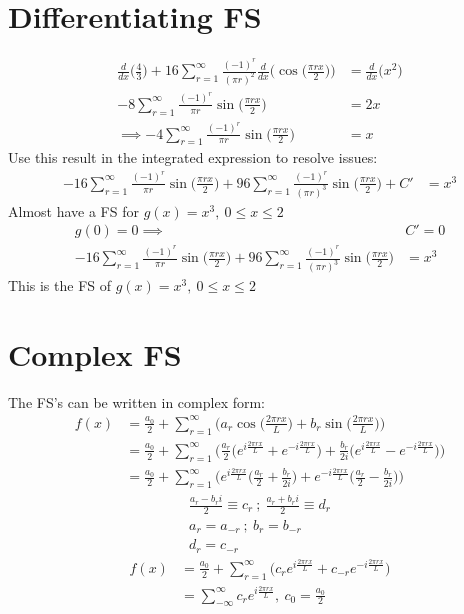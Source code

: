 \documentclass[a4paper, 11pt, normalem]{report}
\begin{document}
\section{Differentiating FS}
\begin{align*}
    \frac{d}{dx}\bigg(\frac{4}{3}\bigg) + 16\sum_{r = 1}^{\infty} \frac{(-1)^r}{(\pi r)^2} \frac{d}{dx}\bigg(\cos\Big(\frac{\pi rx}{2}\Big)\bigg) &= \frac{d}{dx}\bigg(x^2\bigg) \\
    -8 \sum_{r = 1}^{\infty} \frac{(-1)^r}{\pi r} \sin\Big(\frac{\pi rx}{2}\Big) &= 2x \\
    \implies -4\sum_{r = 1}^{\infty} \frac{(-1)^r}{\pi r} \sin\Big(\frac{\pi rx}{2}\Big) &= x
\end{align*}
Use this result in the integrated expression to resolve issues:
\begin{align*}
    -16\sum_{r = 1}^{\infty} \frac{(-1)^r}{\pi r} \sin\Big(\frac{\pi rx}{2}\Big) + 96\sum_{r = 1}^{\infty} \frac{(-1)^r}{(\pi r)^3}\sin\Big(\frac{\pi rx}{2}\Big) + C' &= x^3
\end{align*}
Almost have a FS for $g(x) = x^3,~ 0 \leq x \leq 2$
\begin{align*}
    g(0) = 0 \implies& C' = 0 \\
    -16\sum_{r = 1}^{\infty} \frac{(-1)^r}{\pi r} \sin\Big(\frac{\pi rx}{2}\Big) + 96\sum_{r = 1}^{\infty} \frac{(-1)^r}{(\pi r)^3}\sin\Big(\frac{\pi rx}{2}\Big) &= x^3
\end{align*}
This is the FS of $g(x) = x^3,~ 0 \leq x \leq 2$

\section{Complex FS}
The FS's can be written in complex form:
\begin{align*}
    f(x) &= \frac{a_0}{2} + \sum_{r = 1}^{\infty} \bigg(a_r \cos\Big(\frac{2\pi rx}{L}\Big) + b_r \sin\Big(\frac{2\pi rx}{L}\Big)\bigg) \\
    &= \frac{a_0}{2} + \sum_{r = 1}^{\infty} \Bigg(\frac{a_r}{2}\bigg(e^{i\tfrac{2\pi rx}{L}} + e^{-i\tfrac{2\pi rx}{L}}\bigg) + \frac{b_r}{2i}\bigg(e^{i\tfrac{2\pi rx}{L}} - e^{-i\tfrac{2\pi rx}{L}} \bigg)\Bigg) \\
    &= \frac{a_0}{2} + \sum_{r = 1}^{\infty} \Bigg(e^{i\tfrac{2\pi rx}{L}} \Big(\frac{a_r}{2} + \frac{b_r}{2i}\Big) + e^{-i\tfrac{2\pi rx}{L}}\Big(\frac{a_r}{2} - \frac{b_r}{2i}\Big)\Bigg)
\end{align*}
\begin{gather*}
    \frac{a_r - b_r i}{2} \equiv c_r ~;~ \frac{a_r + b_r i}{2} \equiv d_r \\
    a_r = a_{-r} ~;~ b_r = b_{-r} \\
    d_r = c_{-r}
\end{gather*}
\begin{align*}
    f(x) &= \frac{a_0}{2} + \sum_{r = 1}^{\infty} \bigg(c_r e^{i\tfrac{2\pi rx}{L}} + c_{-r}e^{-i\tfrac{2\pi rx}{L}}\bigg) \\
    &= \sum_{-\infty}^{\infty} c_r e^{i\tfrac{2\pi rx}{L}},~ c_0 = \frac{a_0}{2}
\end{align*}
\end{document}
